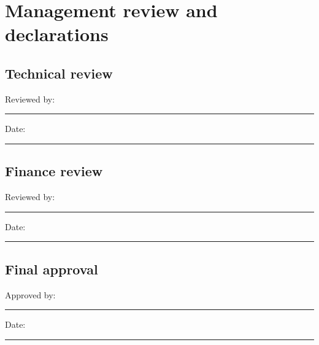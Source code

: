 \documentclass[11pt]{article}
\begin{document}
\section{Management review and declarations}
\subsection{Technical review}
Reviewed by: \rule{6cm}{0.4pt} \hfill Date: \rule{3cm}{0.4pt}

\subsection{Finance review}
Reviewed by: \rule{6cm}{0.4pt} \hfill Date: \rule{3cm}{0.4pt}

\subsection{Final approval}
Approved by: \rule{6cm}{0.4pt} \hfill Date: \rule{3cm}{0.4pt}

\RDEndMatter
\end{document}
